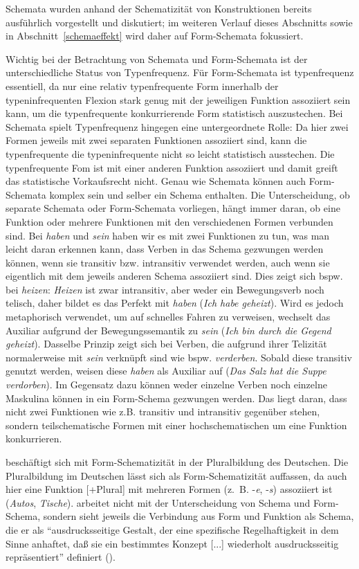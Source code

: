  
Schemata wurden anhand der Schematizität von Konstruktionen bereits ausführlich vorgestellt und diskutiert; im weiteren Verlauf dieses Abschnitts sowie in Abschnitt~\ref{schemaeffekt} wird daher auf Form-Schemata fokussiert.       


Wichtig bei der Betrachtung von Schemata und Form-Schemata ist der unterschiedliche Status von Typenfrequenz. Für Form-Schemata ist typenfrequenz essentiell, da nur eine relativ typenfrequente Form innerhalb der typeninfrequenten Flexion stark genug mit der jeweiligen Funktion assoziiert sein kann, um die typenfrequente konkurrierende Form statistisch auszustechen. Bei Schemata spielt Typenfrequenz hingegen eine untergeordnete Rolle: Da hier zwei Formen jeweils mit zwei separaten Funktionen assoziiert sind, kann die typenfrequente die typeninfrequente nicht so leicht statistisch ausstechen. Die typenfrequente Fom ist mit einer anderen Funktion assoziiert und damit greift das statistische Vorkaufsrecht nicht. Genau wie Schemata können auch Form-Schemata komplex sein und selber ein Schema enthalten. Die Unterscheidung, ob separate Schemata oder Form-Schemata vorliegen, hängt immer daran, ob eine Funktion oder mehrere Funktionen mit den verschiedenen Formen verbunden sind. Bei \textit{haben} und \textit{sein} haben wir es mit zwei Funktionen zu tun, was man leicht daran erkennen kann, dass Verben in das Schema gezwungen werden können, wenn sie transitiv bzw. intransitiv verwendet werden, auch wenn sie eigentlich mit dem jeweils anderen Schema assoziiert sind. Dies zeigt sich bspw. bei \textit{heizen}: \textit{Heizen} ist zwar intransitiv, aber weder ein Bewegungsverb noch telisch, daher bildet es das Perfekt mit \textit{haben} (\textit{Ich habe geheizt}). Wird es jedoch metaphorisch verwendet, um auf schnelles Fahren zu verweisen, wechselt das Auxiliar aufgrund der Bewegungssemantik zu \textit{sein} (\textit{Ich bin durch die Gegend geheizt}). Dasselbe Prinzip zeigt sich bei Verben, die aufgrund ihrer Telizität normalerweise mit \textit{sein} verknüpft sind wie bspw. \textit{verderben}. Sobald diese transitiv genutzt werden, weisen diese \textit{haben} als Auxiliar auf (\textit{Das Salz hat die Suppe verdorben}). Im Gegensatz dazu können weder einzelne Verben noch einzelne Maskulina können in ein Form-Schema gezwungen werden. Das liegt daran, dass nicht zwei Funktionen wie z.B. transitiv und intransitiv gegenüber stehen, sondern teilschematische Formen mit einer hochschematischen um eine Funktion konkurrieren. 

\textcite{Kopcke.1993} beschäftigt sich mit Form-Schematizität in der Pluralbildung des Deutschen. Die Pluralbildung im Deutschen lässt sich als Form-Schematizität auffassen, da auch hier eine Funktion [+Plural] mit mehreren Formen (z.~B. -\textit{e}, -\textit{s}) assoziiert ist (\textit{Autos}, \textit{Tische}). \textcite{Kopcke.1993} arbeitet nicht mit der Unterscheidung von Schema und Form-Schema, sondern sieht jeweils die Verbindung aus Form und Funktion als Schema, die er als "`ausdrucksseitige Gestalt, der eine spezifische Regelhaftigkeit in dem Sinne anhaftet, daß sie ein bestimmtes Konzept [...] wiederholt ausdrucksseitig repräsentiert"' definiert (\cite[72]{Kopcke.1993}). 


